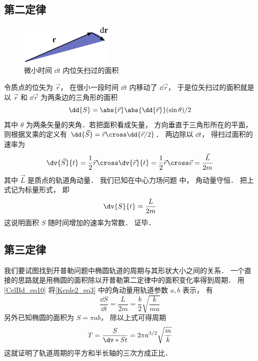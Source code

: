 

\subsection{第二定律}
\begin{figure}[ht]
\centering
\includegraphics[width=4.5cm]{./figures/Keple21.pdf}
\caption{微小时间 $\dd{t}$ 内位矢扫过的面积} \label{Keple2_fig1}
\end{figure}

令质点的位矢为 $\vec r$，  在很小一段时间 $\dd{t}$ 内移动了 $\dd{\vec r}$，  于是位矢扫过的面积就是以 $\vec r$ 和 $\dd{\vec r}$ 为两条边的三角形的面积
\begin{equation}
\dd{S} = \abs{\vec r} \abs{\dd{\vec r}} (\sin \theta) /2
\end{equation}
其中 $\theta$ 为两条矢量的夹角．若把面积看成矢量， 方向垂直于三角形所在的平面， 则根据叉乘的定义有 $\dd{\vec S} = \vec r \cross \dd{\vec r/2}$． 两边除以 $\dd{t}$，  得扫过面积的速率为
\begin{equation}
\dv{\vec S}{t} = \frac12 \vec r \cross \dv{\vec r}{t} = \frac12 \vec r\cross \vec v = \frac{\vec L}{2m}
\end{equation}
其中 $\vec L$ 是质点的轨道角动量． 我们已知在中心力场问题 中， 角动量守恒． 把上式记为标量形式， 即
\begin{equation}\label{Keple2_eq3}
\dv{S}{t} = \frac{L}{2m}
\end{equation}
这说明面积 $S$ 随时间增加的速率为常数． 证毕．

\subsection{第三定律}
我们要试图找到开普勒问题中椭圆轨道的周期与其形状大小之间的关系． 一个直接的思路就是用椭圆的面积除以开普勒第二定律中的面积变化率得到周期． 用\autoref{CelBd_eq10}  将\autoref{Keple2_eq3} 中的角动量用轨道参数 $a,b$ 表示， 有
\begin{equation}
\frac{\dd{S}}{\dd{t}} = \frac{L}{2m} = \frac b2 \sqrt{\frac{k}{ma}}
\end{equation}
另外已知椭圆的面积为 $S = \pi ab$， 除以上式可得周期
\begin{equation}
T = \frac{S}{\dv*{S}{t}} = 2\pi a^{3/2} \sqrt{\frac mk}
\end{equation}
这就证明了轨道周期的平方和半长轴的三次方成正比．